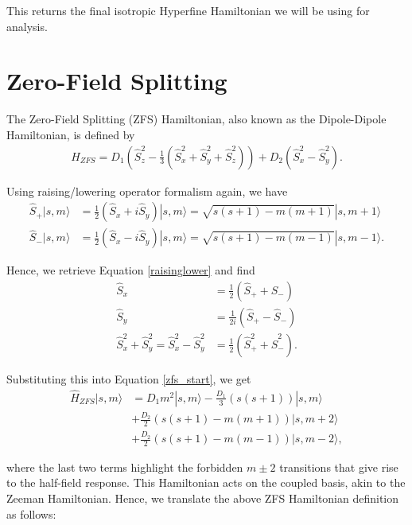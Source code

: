 \documentclass[svgnames]{article}
\begin{document}
This returns the final isotropic Hyperfine Hamiltonian we will be using for
analysis. 

\newpage
\section{Zero-Field Splitting}

The Zero-Field Splitting (ZFS) Hamiltonian, also known as the Dipole-Dipole
Hamiltonian, is defined by
\begin{align} \label{zfs_start}
    \hat{H}_{ZFS} = D_1\left(\hat{S}_z^2 - \frac{1}{3}\left(\hat{S}_x^2 + \hat{S}_y^2 +
    \hat{S}_z^2 \right) \right) + D_2\left(\hat{S}_x^2 - \hat{S}_y^2\right).
\end{align} \vspace{3px}

Using raising/lowering operator formalism again, we have 
\begin{align*}
    \hat{S}_+|s, m\rangle &= \frac{1}{2}\left(\hat{S}_x + i \hat{S}_y\right) |s,
  m\rangle = \sqrt{s(s+1) - m(m+1)}|s, m+1\rangle \\ 
    \hat{S}_-|s, m\rangle &= \frac{1}{2}\left(\hat{S}_x - i \hat{S}_y\right) |s,
    m\rangle = \sqrt{s(s+1) - m(m-1)}|s, m-1\rangle.
\end{align*}

Hence, we retrieve Equation \ref{raisinglower} and find 
\begin{align*}
    \hat{S}_x &= \frac{1}{2}\left( \hat{S}_+ + \hat{S}_- \right) \\ 
    \hat{S}_y &= \frac{1}{2i}\left(\hat{S}_+ - \hat{S}_- \right) \\ 
    \hat{S}_x^2 + \hat{S}_y^2 = \hat{S}_x^2 - \hat{S}_y^2 &= \frac{1}{2}\left(
    \hat{S}_+^2 + \hat{S}_-^2 \right).  
\end{align*}

Substituting this into Equation \ref{zfs_start}, we get 
\begin{align} \label{zfs_state}
    \hat{H}_{ZFS} |s, m\rangle &= D_1m^2|s, m\rangle - \frac{D_1}{3}(s(s+1))|s,
    m\rangle \\ 
                               &+ \frac{D_2}{2}(s(s+1) - m(m+1))|s, m+2\rangle
                            \\ &+ \frac{D_2}{2}(s(s+1) - m(m-1))|s, m-2\rangle, 
\end{align}\vspace{3px} 

where the last two terms highlight the forbidden $m\pm 2$ transitions that give
rise to the half-field response. This Hamiltonian acts on the coupled basis,
akin to the Zeeman Hamiltonian. Hence, we translate the above ZFS
Hamiltonian definition as follows: 
\end{document}
